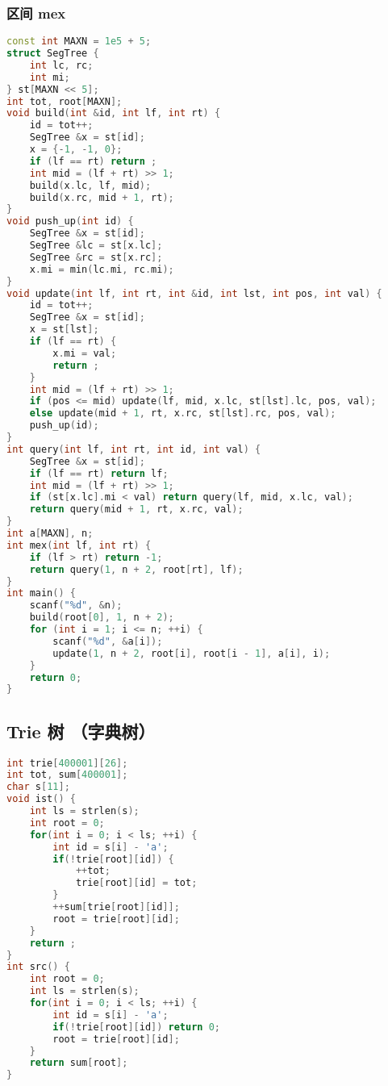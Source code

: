 \subsubsection{区间 mex}

\begin{lstlisting}[language=C++]
const int MAXN = 1e5 + 5;
struct SegTree {
    int lc, rc;
    int mi;
} st[MAXN << 5];
int tot, root[MAXN];
void build(int &id, int lf, int rt) {
    id = tot++;
    SegTree &x = st[id];
    x = {-1, -1, 0};
    if (lf == rt) return ;
    int mid = (lf + rt) >> 1;
    build(x.lc, lf, mid);
    build(x.rc, mid + 1, rt);
}
void push_up(int id) {
    SegTree &x = st[id];
    SegTree &lc = st[x.lc];
    SegTree &rc = st[x.rc];
    x.mi = min(lc.mi, rc.mi);
}
void update(int lf, int rt, int &id, int lst, int pos, int val) {
    id = tot++;
    SegTree &x = st[id];
    x = st[lst];
    if (lf == rt) {
        x.mi = val;
        return ;
    }
    int mid = (lf + rt) >> 1;
    if (pos <= mid) update(lf, mid, x.lc, st[lst].lc, pos, val);
    else update(mid + 1, rt, x.rc, st[lst].rc, pos, val);
    push_up(id);
}
int query(int lf, int rt, int id, int val) {
    SegTree &x = st[id];
    if (lf == rt) return lf;
    int mid = (lf + rt) >> 1;
    if (st[x.lc].mi < val) return query(lf, mid, x.lc, val);
    return query(mid + 1, rt, x.rc, val);
}
int a[MAXN], n;
int mex(int lf, int rt) {
    if (lf > rt) return -1;
    return query(1, n + 2, root[rt], lf);
}
int main() {
    scanf("%d", &n);
    build(root[0], 1, n + 2);
    for (int i = 1; i <= n; ++i) {
        scanf("%d", &a[i]);
        update(1, n + 2, root[i], root[i - 1], a[i], i);
    }
    return 0;
}   

\end{lstlisting}

\subsection{Trie 树 （字典树）}

\begin{lstlisting}[language=C++]
int trie[400001][26];
int tot, sum[400001];
char s[11];
void ist() {
    int ls = strlen(s);
    int root = 0;
    for(int i = 0; i < ls; ++i) {
        int id = s[i] - 'a';
        if(!trie[root][id]) {
            ++tot;
            trie[root][id] = tot;
        }
        ++sum[trie[root][id]];
        root = trie[root][id];
    }
    return ;
}
int src() {
    int root = 0;
    int ls = strlen(s);
    for(int i = 0; i < ls; ++i) {
        int id = s[i] - 'a';
        if(!trie[root][id]) return 0;
        root = trie[root][id];
    }
    return sum[root];
}
\end{lstlisting}

